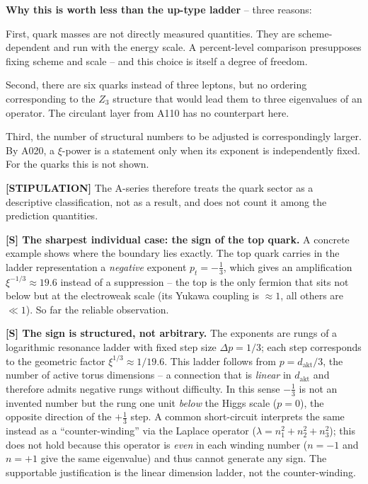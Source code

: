 \textbf{Why this is worth less than the up-type ladder} -- three reasons:

First, quark masses are not directly measured quantities. They are scheme-dependent
and run with the energy scale. A percent-level comparison presupposes fixing scheme
and scale -- and this choice is itself a degree of freedom.

Second, there are six quarks instead of three leptons, but no ordering
corresponding to the $Z_3$ structure that would lead them to three eigenvalues of
an operator. The circulant layer from A110 has no counterpart here.

Third, the number of structural numbers to be adjusted is correspondingly larger.
By A020, a $\xi$-power is a statement only when its exponent is independently
fixed. For the quarks this is not shown.

\textbf{[STIPULATION]} The A-series therefore treats the quark sector as a
descriptive classification, not as a result, and does not count it among the
prediction quantities.

\textbf{[S] The sharpest individual case: the sign of the top quark.} A concrete
example shows where the boundary lies exactly. The top quark carries in the ladder
representation a \emph{negative} exponent $p_t = -\tfrac13$, which gives an
amplification $\xi^{-1/3}\approx 19{.}6$ instead of a suppression -- the top is
the only fermion that sits not below but at the electroweak scale (its Yukawa
coupling is $\approx 1$, all others are $\ll 1$). So far the reliable observation.

\textbf{[S] The sign is structured, not arbitrary.} The exponents are rungs of a
logarithmic resonance ladder with fixed step size $\Delta p = 1/3$; each step
corresponds to the geometric factor $\xi^{1/3}\approx 1/19{.}6$. This ladder
follows from $p = d_\text{akt}/3$, the number of active torus dimensions -- a
connection that is \emph{linear} in $d_\text{akt}$ and therefore admits negative
rungs without difficulty. In this sense $-\tfrac13$ is not an invented number but
the rung one unit \emph{below} the Higgs scale ($p=0$), the opposite direction
of the $+\tfrac13$ step. A common short-circuit interprets the same instead as a
``counter-winding'' via the Laplace operator ($\lambda=n_1^2+n_2^2+n_3^2$);
this does not hold because this operator is \emph{even} in each winding number
($n=-1$ and $n=+1$ give the same eigenvalue) and thus cannot generate any sign.
The supportable justification is the linear dimension ladder, not the counter-winding.

